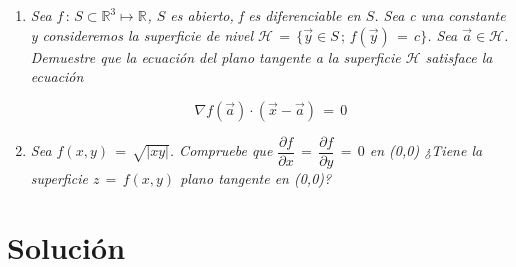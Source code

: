 \documentclass[12pt]{article}
\newcommand{\solucion}{\section{Solución}}
\newcommand{\Rn}[1]{\mathbb{R}^{#1}}
\begin{document}
\begin{enumerate}
		\item \textit{Sea $f \, : \, S \subset \Rn{3} \mapsto \Rn{}$, $S$ es abierto, f es diferenciable en $S$. Sea c una constante y consideremos la superficie de nivel $\mathscr{H} \, = \, \{\vec{y} \in S \, ; \, f(\vec{y}) \, = \, c \}$. Sea $\vec{a} \in \mathscr{H}$. Demuestre que la ecuación del plano tangente a la superficie $\mathscr{H}$ satisface la ecuación}
		
		$$ \nabla f (\vec{a}) \cdot (\vec{x} - \vec{a}) \, = \, 0 $$
		
		\item \textit{Sea $f(x,y) \, = \, \sqrt{| xy |}$. Compruebe que $\dfrac{\partial f}{\partial x} \, = \, \dfrac{\partial f}{\partial y} \, = \, 0$ en (0,0) ¿Tiene la superficie $z \, = \, f(x,y)$ plano tangente en (0,0)?}
		
	\end{enumerate}
	
	\pagebreak 
	
	\solucion
	
\end{document}
